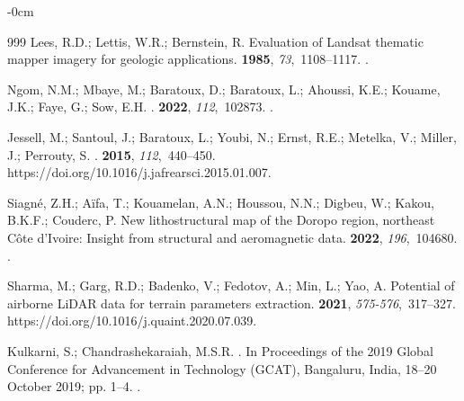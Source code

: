 \documentclass[jimaging,article,accept,pdftex,moreauthors]{Definitions/mdpi}
\begin{document}
\begin{adjustwidth}{-\extralength}{0cm}
\begin{thebibliography}{999}
Lees, R.D.; Lettis, W.R.; Bernstein, R.
\newblock Evaluation of Landsat thematic mapper imagery for geologic
  applications.
 {\bf 1985}, {\em 73},~1108--1117.
.

Ngom, N.M.; Mbaye, M.; Baratoux, D.; Baratoux, L.; Ahoussi, K.E.; Kouame, J.K.;
  Faye, G.; Sow, E.H.
.
 {\bf 2022}, {\em 112},~102873.
.

Jessell, M.; Santoul, J.; Baratoux, L.; Youbi, N.; Ernst, R.E.; Metelka, V.;
  Miller, J.; Perrouty, S.
.
 {\bf 2015}, {\em
  112},~440--450.
\newblock %
{https://doi.org/10.1016/j.jafrearsci.2015.01.007}.

Siagné, Z.H.; Aïfa, T.; Kouamelan, A.N.; Houssou, N.N.; Digbeu, W.; Kakou,
  B.K.F.; Couderc, P.
\newblock New lithostructural map of the Doropo region, northeast Côte
  d'Ivoire: Insight from structural and aeromagnetic data.
 {\bf 2022}, {\em
  196},~104680.
.

Sharma, M.; Garg, R.D.; Badenko, V.; Fedotov, A.; Min, L.; Yao, A.
\newblock Potential of airborne LiDAR data for terrain parameters extraction.
 {\bf 2021}, {\em 575-576},~317--327.
\newblock %
{https://doi.org/10.1016/j.quaint.2020.07.039}.

Kulkarni, S.; Chandrashekaraiah, M.S.R.
.
\newblock In Proceedings of the 2019 Global Conference for Advancement in
  Technology (GCAT), Bangaluru, India, 18--20 October 2019; pp. 1--4.
. %


\end{thebibliography}
\end{adjustwidth}
\end{document}
